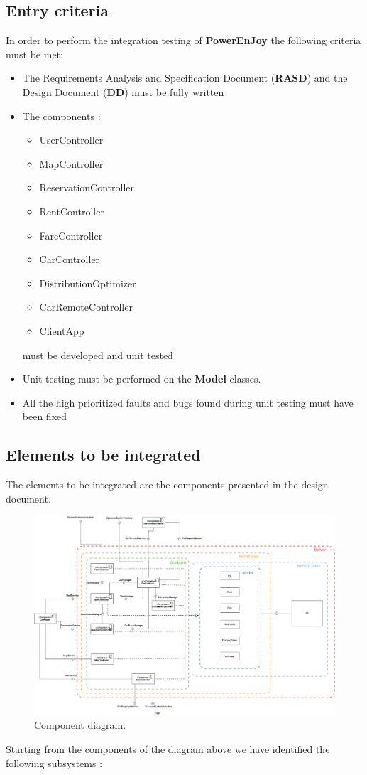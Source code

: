 \subsection{Entry criteria}

In order to perform the integration testing of \textbf{PowerEnJoy} the following criteria must be met:
\begin{itemize}
\item The Requirements Analysis and Specification Document (\textbf{RASD}) and the Design Document (\textbf{DD}) must be fully written
\item The components :
\begin{itemize}
\item UserController
\item MapController
\item ReservationController
\item RentController
\item FareController
\item CarController
\item DistributionOptimizer
\item CarRemoteController
\item ClientApp
\end{itemize}
must be developed and unit tested
\item Unit testing must be performed on the \textbf{Model} classes.
\item All the high prioritized faults and bugs found during unit testing must have been fixed
\end{itemize}
\newpage

\subsection{Elements to be integrated}
The elements to be integrated are the components presented in the design document.


\begin{figure}[hp]
\centering
\includegraphics[width=450 pt]{resources/components.png}
\caption{\label{fig:component}Component diagram.}
\end{figure}
Starting from the components of the  diagram above we have identified the following subsystems :

